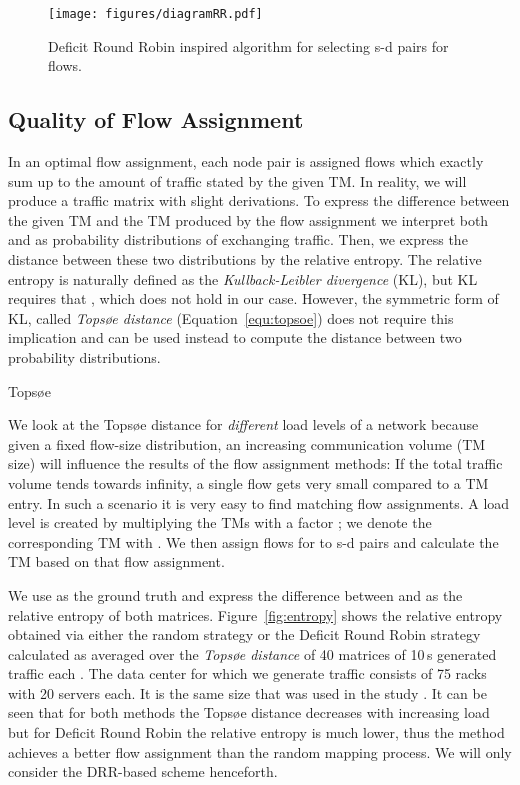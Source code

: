 \documentclass[journal,10pt]{IEEEtran}
\begin{document}
		\begin{figure}[t]
			\centering
			\texttt{[image: figures/diagramRR.pdf]}
	        \caption{Deficit Round Robin inspired algorithm for selecting s-d pairs for flows.}
    		    \label{alg:srcdst}
		\end{figure}
		
\subsection{Quality of Flow Assignment}

In an optimal flow assignment, each node pair is assigned flows which
exactly sum up to the amount of traffic stated by the given TM.
In reality, we will produce a traffic matrix with slight derivations.
To express the difference between the given TM  and the TM  produced by the flow assignment
we interpret both  and  as probability distributions of exchanging traffic.
Then, we express the distance between these two distributions by the relative entropy.
The relative entropy is naturally defined as the \emph{Kullback-Leibler divergence} (KL), but KL requires that 
, which does not hold in our case. 
However, the symmetric form of KL, called \emph{Topsøe distance} (Equation~\ref{equ:topsoe}) \cite{johnson2001symmetrizing}
does not require this implication and can be used instead to compute the distance between two probability distributions.

\vspace{0.3cm}

Topsøe


We look at the Topsøe distance for \emph{different} load levels of a network because
given a fixed flow-size distribution, an increasing communication volume (TM size) will influence the results of the flow assignment methods:
If the total traffic volume tends towards infinity, a single flow gets very small compared to a TM entry.
In such a scenario it is very easy to find matching flow assignments.
A load level is created by multiplying the TMs with a factor ;
we denote the corresponding TM with .
We then assign flows for  to s-d pairs and calculate the TM  based on that flow assignment.


We use  as the ground truth and express the difference between  and  as the relative entropy of both matrices.
Figure~\ref{fig:entropy} shows the relative entropy obtained via either the random strategy or the Deficit Round Robin strategy
calculated as averaged over the \emph{Topsøe distance} of 40 matrices of 10\,s generated traffic each
.
The data center for which we generate traffic consists of 75 racks with 20 servers each.
It is the same size that was used in the study \cite{MSR-datacenters}.
It can be seen that for both methods the Topsøe distance decreases with increasing load but for Deficit Round Robin the relative entropy
is much lower, thus the method achieves a better flow assignment than the random mapping process.
We will only consider the DRR-based scheme henceforth.
\end{document}
